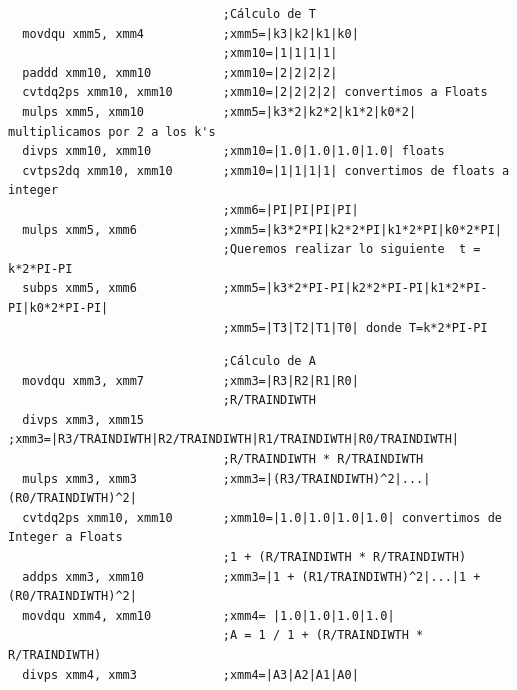 \begin{codesnippet}
\begin{verbatim}
                              ;Cálculo de T
  movdqu xmm5, xmm4           ;xmm5=|k3|k2|k1|k0|
                              ;xmm10=|1|1|1|1| 
  paddd xmm10, xmm10          ;xmm10=|2|2|2|2|
  cvtdq2ps xmm10, xmm10       ;xmm10=|2|2|2|2| convertimos a Floats
  mulps xmm5, xmm10           ;xmm5=|k3*2|k2*2|k1*2|k0*2| multiplicamos por 2 a los k's
  divps xmm10, xmm10          ;xmm10=|1.0|1.0|1.0|1.0| floats
  cvtps2dq xmm10, xmm10       ;xmm10=|1|1|1|1| convertimos de floats a integer
                              ;xmm6=|PI|PI|PI|PI|
  mulps xmm5, xmm6            ;xmm5=|k3*2*PI|k2*2*PI|k1*2*PI|k0*2*PI|
                              ;Queremos realizar lo siguiente  t = k*2*PI-PI
  subps xmm5, xmm6            ;xmm5=|k3*2*PI-PI|k2*2*PI-PI|k1*2*PI-PI|k0*2*PI-PI|
                              ;xmm5=|T3|T2|T1|T0| donde T=k*2*PI-PI 
\end{verbatim}
\end{codesnippet}
\begin{codesnippet}
\begin{verbatim}
                              ;Cálculo de A
  movdqu xmm3, xmm7           ;xmm3=|R3|R2|R1|R0|
                              ;R/TRAINDIWTH
  divps xmm3, xmm15           ;xmm3=|R3/TRAINDIWTH|R2/TRAINDIWTH|R1/TRAINDIWTH|R0/TRAINDIWTH|
                              ;R/TRAINDIWTH * R/TRAINDIWTH
  mulps xmm3, xmm3            ;xmm3=|(R3/TRAINDIWTH)^2|...|(R0/TRAINDIWTH)^2|
  cvtdq2ps xmm10, xmm10       ;xmm10=|1.0|1.0|1.0|1.0| convertimos de Integer a Floats
                              ;1 + (R/TRAINDIWTH * R/TRAINDIWTH)
  addps xmm3, xmm10           ;xmm3=|1 + (R1/TRAINDIWTH)^2|...|1 + (R0/TRAINDIWTH)^2|
  movdqu xmm4, xmm10          ;xmm4= |1.0|1.0|1.0|1.0|
                              ;A = 1 / 1 + (R/TRAINDIWTH * R/TRAINDIWTH)
  divps xmm4, xmm3            ;xmm4=|A3|A2|A1|A0|
\end{verbatim}
\end{codesnippet}

